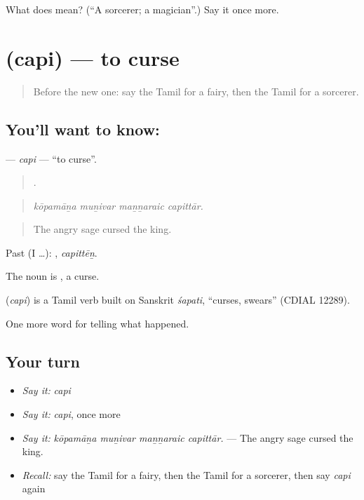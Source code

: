 \begin{tcolorbox}[breakable,colback=teal!4,colframe=teal!35!black,title={Before you move on}]
What does  mean? (\textquotedblleft{}A sorcerer; a magician\textquotedblright{}.) Say it once more.
\end{tcolorbox}
\section[\texorpdfstring{\ta{சபி} (capi)}{சபி (capi)}]{ (capi) — to curse}

\label{lesson:TA-C344-capi}



\begin{quote}
Before the new one: say the Tamil for a fairy, then the Tamil for a sorcerer.
\end{quote}

\subsection*{You'll want to know: }
\textbf{} — \emph{capi} — \textquotedblleft{}to curse\textquotedblright{}.

\begin{quote}
   .
\end{quote}

\begin{quote}
\emph{kōpamāṉa muṉivar maṉṉaraic capittār.}
\end{quote}

\begin{quote}
The angry sage cursed the king.
\end{quote}

Past (I …): , \emph{capittēṉ}.

The noun is , a curse.

\begin{cousinweb}
\textbf{} (\emph{capi}) is a Tamil verb built on Sanskrit \emph{śapati}, \textquotedblleft{}curses, swears\textquotedblright{} (CDIAL 12289).
\end{cousinweb}

\begin{grammarlens}[title={What you've built}]
One more word for telling what happened.
\end{grammarlens}

\subsection*{Your turn}
\begin{itemize}
\raggedright
  \item \emph{Say it:} \emph{capi}
  \item \emph{Say it:} \emph{capi}, once more
  \item \emph{Say it:} \emph{kōpamāṉa muṉivar maṉṉaraic capittār.} — The angry sage cursed the king.
  \item \emph{Recall:} say the Tamil for a fairy, then the Tamil for a sorcerer, then say \emph{capi} again
\end{itemize}

